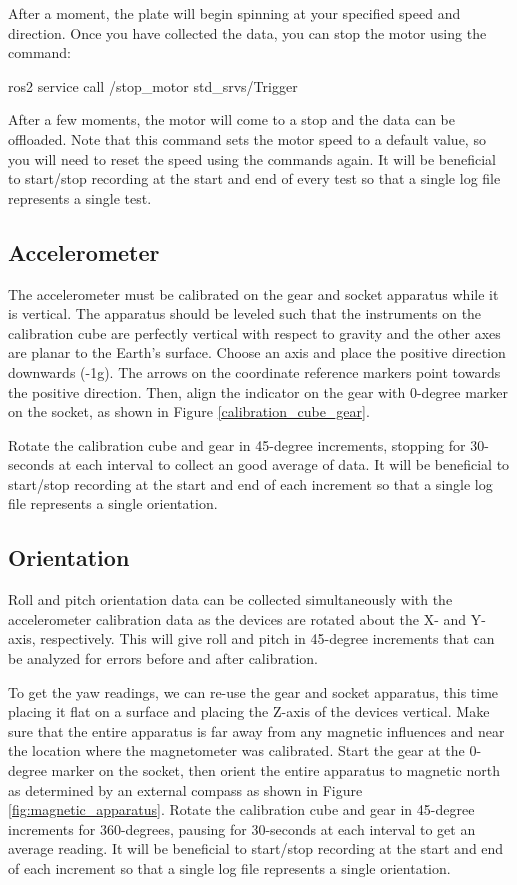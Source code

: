 \noindent After a moment, the plate will begin spinning at your specified speed and direction.
Once you have collected the data, you can stop the motor using the command:

\begin{bash}
    ros2 service call /stop_motor std_srvs/Trigger
\end{bash}

\noindent After a few moments, the motor will come to a stop and the data can be offloaded.
Note that this command sets the motor speed to a default value, so you will need to reset the speed using the commands again.
It will be beneficial to start/stop recording at the start and end of every test so that a single log file represents a single test.

\subsection{Accelerometer}
The accelerometer must be calibrated on the gear and socket apparatus while it is vertical.
The apparatus should be leveled such that the instruments on the calibration cube are perfectly vertical with respect to gravity and the other axes are planar to the Earth's surface.
Choose an axis and place the positive direction downwards (-1g).
The arrows on the coordinate reference markers point towards the positive direction.
Then, align the indicator on the gear with 0-degree marker on the socket, as shown in Figure \ref{calibration_cube_gear}.

Rotate the calibration cube and gear in 45-degree increments, stopping for 30-seconds at each interval to collect an good average of data.
It will be beneficial to start/stop recording at the start and end of each increment so that a single log file represents a single orientation.

\subsection{Orientation}
Roll and pitch orientation data can be collected simultaneously with the accelerometer calibration data as the devices are rotated about the X- and Y-axis, respectively.
This will give roll and pitch in 45-degree increments that can be analyzed for errors before and after calibration.

To get the yaw readings, we can re-use the gear and socket apparatus, this time placing it flat on a surface and placing the Z-axis of the devices vertical.
Make sure that the entire apparatus is far away from any magnetic influences and near the location where the magnetometer was calibrated.
Start the gear at the 0-degree marker on the socket, then orient the entire apparatus to magnetic north as determined by an external compass as shown in Figure \ref{fig:magnetic_apparatus}.
Rotate the calibration cube and gear in 45-degree increments for 360-degrees, pausing for 30-seconds at each interval to get an average reading.
It will be beneficial to start/stop recording at the start and end of each increment so that a single log file represents a single orientation.

